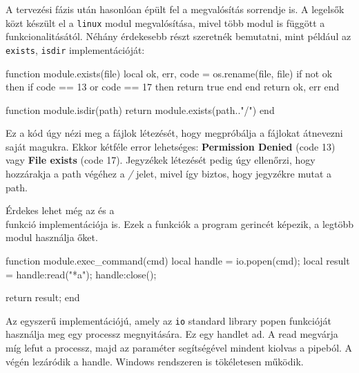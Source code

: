 

A tervezési fázis után hasonlóan épült fel a megvalósítás sorrendje is. A legelsők közt készült el a \texttt{linux} modul megvalósítása, mivel több modul is függött a funkcionalitásától. Néhány érdekesebb részt szeretnék bemutatni, mint például az \texttt{exists}, \texttt{isdir} implementációját:

\begin{lua}
function module.exists(file)
    local ok, err, code = os.rename(file, file)
    if not ok then
        if code == 13 or code == 17 then
            return true
        end
    end
    return ok, err
end
 
function module.isdir(path)
    return module.exists(path.."/")
end
\end{lua}

Ez a kód úgy nézi meg a fájlok létezését, hogy megpróbálja a fájlokat átnevezni saját magukra. Ekkor kétféle error lehetséges: \textbf{Permission Denied} (code 13) vagy \textbf{File exists} (code 17). Jegyzékek létezését pedig úgy ellenőrzi, hogy hozzárakja a path végéhez a \textit{/} jelet, mivel így biztos, hogy jegyzékre mutat a path.

Érdekes lehet még az \texttt{} és a \texttt{}\\ funkció implementációja is. Ezek a funkciók a program gerincét képezik, a legtöbb modul használja őket.

\begin{lua}
function module.exec_command(cmd)
    local handle = io.popen(cmd);
    local result = handle:read("*a");
    handle:close();

    return result;
end
\end{lua}

\pagebreak
Az \texttt{} egyszerű implementációjú, amely az \texttt{io} standard library popen funkcióját használja meg egy processz megnyitására. Ez egy handlet ad. A read megvárja míg lefut a processz, majd az \texttt{} paraméter segítségével mindent kiolvas a pipeból. A végén lezáródik a handle. Windows rendszeren is tökéletesen működik.


